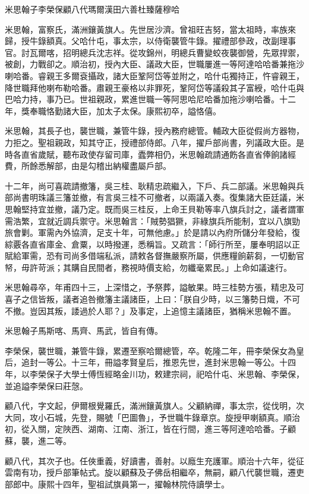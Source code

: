
\begin{pinyinscope}
米思翰子李榮保顧八代瑪爾漢田六善杜臻薩穆哈

米思翰，富察氏，滿洲鑲黃旗人。先世居沙濟。曾祖旺吉努，當太祖時，率族來歸，授牛錄額真。父哈什屯，事太宗，以侍衛襲管牛錄。擢禮部參政，改副理事官。討瓦爾喀，招明總兵沈志祥。從攻錦州，明總兵曹變蛟夜襲御營，先眾捍禦，被創，力戰卻之。順治初，授內大臣、議政大臣，世職屢進一等阿達哈哈番兼拖沙喇哈番。睿親王多爾袞攝政，諸大臣鞏阿岱等並附之，哈什屯獨持正，忤睿親王，降世職拜他喇布勒哈番。肅親王豪格以非罪死，鞏阿岱等議殺其子富綬，哈什屯與巴哈力持，事乃已。世祖親政，累進世職一等阿思哈尼哈番加拖沙喇哈番。十二年，獎奉職恪勤諸大臣，加太子太保。康熙初卒，謚恪僖。

米思翰，其長子也，襲世職，兼管牛錄，授內務府總管。輔政大臣從假尚方器物，力拒之。聖祖親政，知其守正，授禮部侍郎。八年，擢戶部尚書，列議政大臣。是時各直省歲賦，聽布政使存留司庫，蠹弊相仍，米思翰疏請通飭各直省俸餉諸經費，所餘悉解部，由是勾稽出納權盡屬戶部。

十二年，尚可喜疏請撤籓，吳三桂、耿精忠疏繼入，下戶、兵二部議。米思翰與兵部尚書明珠議三籓並撤，有言吳三桂不可撤者，以兩議入奏。復集諸大臣廷議，米思翰堅持宜並撤，議乃定。既而吳三桂反，上命王貝勒等率八旗兵討之，議者謂軍需浩繁，宜就近調兵禦守。米思翰言：「賊勢猖獗，非綠旗兵所能制，宜以八旗勁旅會剿。軍需內外協濟，足支十年，可無他慮。」於是請以內府所儲分年發給，復綜覈各直省庫金、倉粟，以時撥運，悉稱旨。又疏言：「師行所至，屢奉明詔以正賦給軍需，恐有司尚多借端私派，請敕各督撫嚴察所屬，供應糧餉薪芻，一切動官帑，毋許苛派；其購自民間者，務視時價支給，勿纖毫累民。」上命如議速行。

米思翰尋卒，年甫四十三，上深惜之，予祭葬，謚敏果。時三桂勢方張，精忠及可喜子之信皆叛，議者追咎撤籓主議諸臣，上曰：「朕自少時，以三籓勢日熾，不可不撤。豈因其叛，諉過於人耶？」及事定，上追憶主議諸臣，猶稱米思翰不置。

米思翰子馬斯喀、馬齊、馬武，皆自有傳。

李榮保，襲世職，兼管牛錄，累遷至察哈爾總管，卒。乾隆二年，冊李榮保女為皇后，追封一等公。十三年，冊謚孝賢皇后，推恩先世，進封米思翰一等公。十四年，以李榮保子大學士傅恆經略金川功，敕建宗祠，祀哈什屯、米思翰、李榮保，並追謚李榮保曰莊愨。

顧八代，字文起，伊爾根覺羅氏，滿洲鑲黃旗人。父顧納禪，事太宗，從伐明，次大同，攻小石城，先登，賜號「巴圖魯」，予世職牛錄章京。旋授甲喇額真。順治初，從入關，定陜西、湖南、江南、浙江，皆在行間，進三等阿達哈哈番。子顧蘇，襲，進二等。

顧八代，其次子也。任俠重義，好讀書，善射。以廕生充護軍。順治十六年，從征雲南有功，授戶部筆帖式。旋以顧蘇及子佛岳相繼卒，無嗣，顧八代襲世職，遷吏部郎中。康熙十四年，聖祖試旗員第一，擢翰林院侍讀學士。


\end{pinyinscope}
